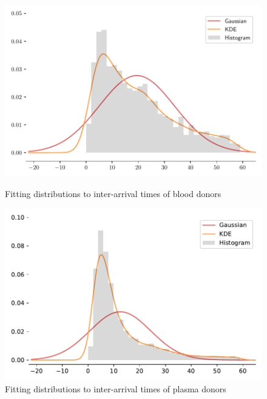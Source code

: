 \documentclass[a4paper,12pt]{article}
\begin{document}
\begin{figure}[H]
    \begin{minipage}[t]{0.5\textwidth}
        \centering
        \includegraphics[scale=0.48]{blood_interarrival_time.pdf}
        \begin{minipage}[t]{0.9\textwidth}
            \centering
            \caption{Fitting distributions to inter-arrival times of blood donors}
        \end{minipage}
    \end{minipage}%
    \begin{minipage}[t]{0.5\textwidth}
        \centering
        \includegraphics[scale=0.48]{plasma_interarrival_time.pdf}
        \begin{minipage}[t]{0.9\textwidth}
            \centering
            \caption{Fitting distributions to inter-arrival times of plasma donors}
            \label{lastfit}
        \end{minipage}
    \end{minipage}
\end{figure}
\end{document}
